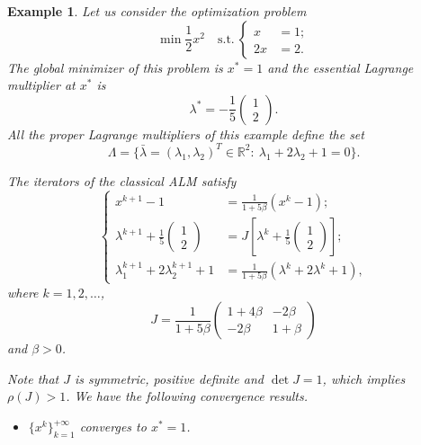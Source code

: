 \documentclass[leqno]{amsart}
\newtheorem{Example}[Theorem]{Example}
\theoremstyle{definition}
\begin{document}
\begin{Example}\label{Exm:ALM}
Let us consider the optimization problem
\begin{equation}\nonumber
\min\frac{1}{2}x^2\quad \mbox{s.t.}\ 
\left\{ 
\begin{aligned}
x & = 1;\\
2x & = 2.
\end{aligned}
\right.
\end{equation}
The global minimizer of this problem is $x^* = 1$ and the essential Lagrange multiplier at $x^*$ is 
$$\lambda^* = -\frac{1}{5}\begin{pmatrix}1\\ 2 \end{pmatrix}.$$
All the proper Lagrange multipliers of this example define the set
$$\Lambda = \{\bar{\lambda} = (\lambda_1, \lambda_2)^T\in \mathbb{R}^2:\ \lambda_1 + 2\lambda_2 + 1 = 0\}.$$

The iterators of the classical ALM satisfy 
\begin{equation}\nonumber
\left\{
\begin{aligned}
x^{k+1} - 1 & =  \frac{1}{1+5\beta}(x^{k} - 1);\\
\lambda^{k+1} + \frac{1}{5}\begin{pmatrix}1\\ 2 \end{pmatrix}
& = J\left[\lambda^k + \frac{1}{5}\begin{pmatrix}1\\ 2 \end{pmatrix}\right];\\
\lambda^{k+1}_1 + 2\lambda^{k+1}_2 +1 &= \frac{1}{1+5\beta}(\lambda^{k} + 2\lambda^{k} + 1),
\end{aligned}
\right.
\end{equation}
where $k = 1, 2, \dots$,
$$ J = \frac{1}{1+5\beta}\begin{pmatrix}1+4\beta &  -2\beta\\ -2\beta & 1 + \beta \end{pmatrix}$$
and $\beta > 0$.

Note that $J$ is symmetric, positive definite and $\det J = 1$, which implies $\rho(J) > 1$. We have the following convergence results.
\begin{itemize}
\item $\{x^k\}_{k=1}^{+\infty}$ converges to $x^* = 1$.
\par\vspace{4pt}


\end{itemize}
\end{Example}
\end{document}
